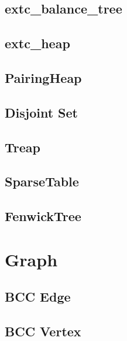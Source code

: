 \documentclass[a4paper,10pt,twocolumn,oneside]{article}
\begin{document}
\subsection{extc\_balance\_tree}


\subsection{extc\_heap}


\subsection{PairingHeap}


\subsection{Disjoint Set}


\subsection{Treap}


\subsection{SparseTable}


\subsection{FenwickTree}


\section{Graph}

\subsection{BCC Edge}


\subsection{BCC Vertex}

\end{document}
